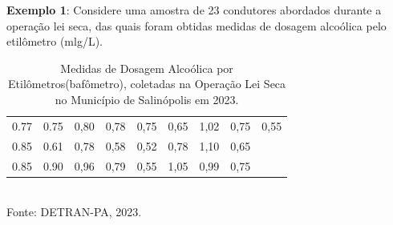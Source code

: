\begin{table}[!htb]
\end{table}
\vskip0.1cm

\newpage

\textbf{Exemplo 1}: Considere uma amostra de 23 condutores abordados durante a operação lei seca, das
quais foram obtidas medidas de dosagem alcoólica pelo etilômetro (mlg/L).\vskip0.3cm


\begin{table}[!htb]
    \centering
    {
    \caption{Medidas de Dosagem Alcoólica por Etilômetros(bafômetro), coletadas na Operação Lei Seca no Município de Salinópolis em 2023.}
    \label{estatura}
    \vspace{0.2cm}
\begin{tabular}{c|c|c|c|c|c|c|c|c}
  \hline\hline
  0.77 & 0.75 & 0,80 & 0,78 & 0,75 & 0,65 & 1,02 & 0,75 & 0,55 \\
  0.85 & 0.61 & 0,78 & 0,58 & 0,52 & 0,78 & 1,10 & 0,65 &    \\
  0.85 & 0.90 & 0,96 & 0,79 & 0,55 & 1,05 & 0,99 & 0,75 &    \\
  \hline\hline
\end{tabular}}
\\
\hspace{-5.5cm}
Fonte: DETRAN-PA, 2023.
\end{table}

